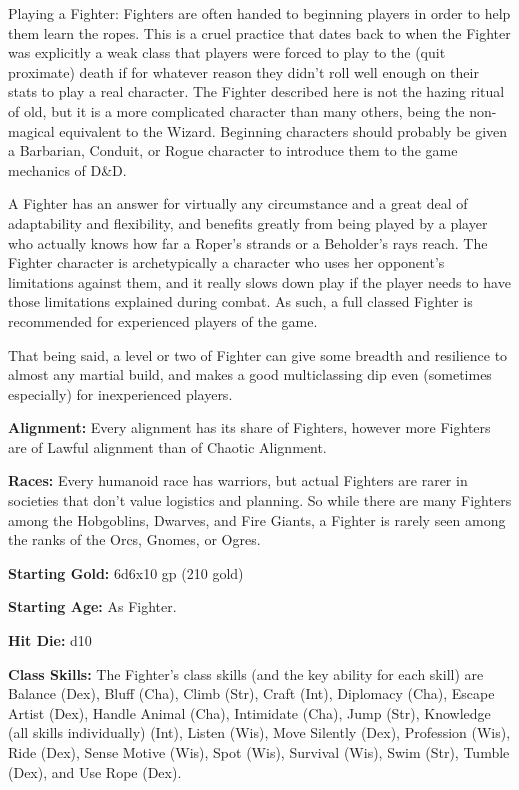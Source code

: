\documentclass[10pt]{article}
\newcommand{\ability}[2]{\smallskip \noindent \textbf{#1} #2}
\newcommand{\desc}[1]{#1 \medskip}
\begin{document}
\desc{Playing a Fighter: Fighters are often handed to beginning players in order to help them learn the ropes. This is a cruel practice that dates back to when the Fighter was explicitly a weak class that players were forced to play to the (quit proximate) death if for whatever reason they didn't roll well enough on their stats to play a real character. The Fighter described here is not the hazing ritual of old, but it is a more complicated character than many others, being the non-magical equivalent to the Wizard. Beginning characters should probably be given a Barbarian, Conduit, or Rogue character to introduce them to the game mechanics of D\&D.}

\desc{A Fighter has an answer for virtually any circumstance and a great deal of adaptability and flexibility, and benefits greatly from being played by a player who actually knows how far a Roper's strands or a Beholder's rays reach. The Fighter character is archetypically a character who uses her opponent's limitations against them, and it really slows down play if the player needs to have those limitations explained during combat. As such, a full classed Fighter is recommended for experienced players of the game.}

\desc{That being said, a level or two of Fighter can give some breadth and resilience to almost any martial build, and makes a good multiclassing dip even (sometimes especially) for inexperienced players.}

\ability{Alignment:}{Every alignment has its share of Fighters, however more Fighters are of Lawful alignment than of Chaotic Alignment.}

\ability{Races:}{Every humanoid race has warriors, but actual Fighters are rarer in societies that don't value logistics and planning. So while there are many Fighters among the Hobgoblins, Dwarves, and Fire Giants, a Fighter is rarely seen among the ranks of the Orcs, Gnomes, or Ogres.}

\ability{Starting Gold:}{6d6x10 gp (210 gold)}

\ability{Starting Age:}{As Fighter.}

\ability{Hit Die:}{d10}

\ability{Class Skills:}{The Fighter's class skills (and the key ability for each skill) are Balance (Dex), Bluff (Cha), Climb (Str), Craft (Int), Diplomacy (Cha), Escape Artist (Dex), Handle Animal (Cha), Intimidate (Cha), Jump (Str), Knowledge (all skills individually) (Int), Listen (Wis), Move Silently (Dex), Profession (Wis), Ride (Dex), Sense Motive (Wis), Spot (Wis), Survival (Wis), Swim (Str), Tumble (Dex), and Use Rope (Dex).}
\end{document}
